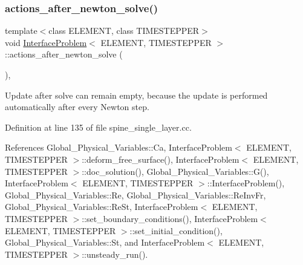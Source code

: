 \subsubsection{\texorpdfstring{actions\+\_\+after\+\_\+newton\+\_\+solve()}{actions\_after\_newton\_solve()}\hspace{0.1cm}{\footnotesize\ttfamily [2/2]}}
{\footnotesize\ttfamily template$<$class E\+L\+E\+M\+E\+NT, class T\+I\+M\+E\+S\+T\+E\+P\+P\+ER$>$ \\
void \hyperlink{classInterfaceProblem}{Interface\+Problem}$<$ E\+L\+E\+M\+E\+NT, T\+I\+M\+E\+S\+T\+E\+P\+P\+ER $>$\+::actions\+\_\+after\+\_\+newton\+\_\+solve (\begin{DoxyParamCaption}{ }\end{DoxyParamCaption})\hspace{0.3cm}{\ttfamily [inline]}, {\ttfamily [private]}}



Update after solve can remain empty, because the update is performed automatically after every Newton step. 



Definition at line 135 of file spine\+\_\+single\+\_\+layer.\+cc.



References Global\+\_\+\+Physical\+\_\+\+Variables\+::\+Ca, Interface\+Problem$<$ E\+L\+E\+M\+E\+N\+T, T\+I\+M\+E\+S\+T\+E\+P\+P\+E\+R $>$\+::deform\+\_\+free\+\_\+surface(), Interface\+Problem$<$ E\+L\+E\+M\+E\+N\+T, T\+I\+M\+E\+S\+T\+E\+P\+P\+E\+R $>$\+::doc\+\_\+solution(), Global\+\_\+\+Physical\+\_\+\+Variables\+::\+G(), Interface\+Problem$<$ E\+L\+E\+M\+E\+N\+T, T\+I\+M\+E\+S\+T\+E\+P\+P\+E\+R $>$\+::\+Interface\+Problem(), Global\+\_\+\+Physical\+\_\+\+Variables\+::\+Re, Global\+\_\+\+Physical\+\_\+\+Variables\+::\+Re\+Inv\+Fr, Global\+\_\+\+Physical\+\_\+\+Variables\+::\+Re\+St, Interface\+Problem$<$ E\+L\+E\+M\+E\+N\+T, T\+I\+M\+E\+S\+T\+E\+P\+P\+E\+R $>$\+::set\+\_\+boundary\+\_\+conditions(), Interface\+Problem$<$ E\+L\+E\+M\+E\+N\+T, T\+I\+M\+E\+S\+T\+E\+P\+P\+E\+R $>$\+::set\+\_\+initial\+\_\+condition(), Global\+\_\+\+Physical\+\_\+\+Variables\+::\+St, and Interface\+Problem$<$ E\+L\+E\+M\+E\+N\+T, T\+I\+M\+E\+S\+T\+E\+P\+P\+E\+R $>$\+::unsteady\+\_\+run().

\mbox{\label{classInterfaceProblem_ae3ec75fcc8ccca97207dc7eca23b1cce}} 
